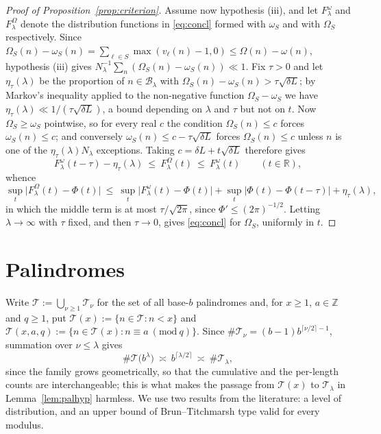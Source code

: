 \documentclass[11pt,a4paper]{article}
\theoremstyle{plain}
\theoremstyle{definition}
\numberwithin{equation}{section}
\begin{document}
\begin{proof}[Proof of Proposition~\ref{prop:criterion}]
Assume now hypothesis (iii), and let $F^{\omega}_\lambda$ and $F^{\Omega}_\lambda$ denote the
distribution functions in \eqref{eq:concl} formed with $\omega_S$ and with $\Omega_S$ respectively.
Since $\Omega_S(n)-\omega_S(n)=\sum_{\ell\in S}\max(v_\ell(n)-1,0)\le\Omega(n)-\omega(n)$, hypothesis
(iii) gives $N_\lambda^{-1}\sum_n(\Omega_S(n)-\omega_S(n))\ll1$. Fix $\tau>0$ and let
$\eta_\tau(\lambda)$ be the proportion of $n\in\mathcal B_\lambda$ with
$\Omega_S(n)-\omega_S(n)>\tau\sqrt{\delta L}$; by Markov's inequality applied to the non-negative
function $\Omega_S-\omega_S$ we have $\eta_\tau(\lambda)\ll1/(\tau\sqrt{\delta L})$, a bound depending
on $\lambda$ and $\tau$ but not on $t$. Now $\Omega_S\ge\omega_S$ pointwise, so for every real $c$ the
condition $\Omega_S(n)\le c$ forces $\omega_S(n)\le c$; and conversely
$\omega_S(n)\le c-\tau\sqrt{\delta L}$ forces $\Omega_S(n)\le c$ unless $n$ is one of the
$\eta_\tau(\lambda)N_\lambda$ exceptions. Taking $c=\delta L+t\sqrt{\delta L}$ therefore gives
\[
F^{\omega}_\lambda(t-\tau)-\eta_\tau(\lambda)\ \le\ F^{\Omega}_\lambda(t)
\ \le\ F^{\omega}_\lambda(t)\qquad(t\in\mathbb R),
\]
whence
\[
\sup_t\bigl|F^{\Omega}_\lambda(t)-\Phi(t)\bigr|\ \le\ \sup_t\bigl|F^{\omega}_\lambda(t)-\Phi(t)\bigr|
+\sup_t\bigl|\Phi(t)-\Phi(t-\tau)\bigr|+\eta_\tau(\lambda),
\]
in which the middle term is at most $\tau/\sqrt{2\pi}$, since $\Phi'\le(2\pi)^{-1/2}$. Letting
$\lambda\to\infty$ with $\tau$ fixed, and then $\tau\to0$, gives \eqref{eq:concl} for $\Omega_S$,
uniformly in $t$.
\end{proof}

\section{Palindromes}\label{sec:pal}

Write $\mathcal T:=\bigcup_{\nu\ge1}\mathcal T_\nu$ for the set of all base-$b$ palindromes and, for
$x\ge1$, $a\in\mathbb Z$ and $q\ge1$, put $\mathcal T(x):=\{n\in\mathcal T:n<x\}$ and
$\mathcal T(x,a,q):=\{n\in\mathcal T(x):n\equiv a\ (\mathrm{mod}\ q)\}$. Since
$\#\mathcal T_\nu=(b-1)b^{\lceil\nu/2\rceil-1}$, summation over $\nu\le\lambda$ gives
\begin{equation}\label{eq:Tsize}
\#\mathcal T\bigl(b^{\lambda}\bigr)\ \asymp\ b^{\lceil\lambda/2\rceil}\ \asymp\ \#\mathcal T_\lambda ,
\end{equation}
since the family grows geometrically, so that the cumulative and the per-length counts are
interchangeable; this is what makes the passage from $\mathcal T(x)$ to $\mathcal T_\lambda$ in
Lemma~\ref{lem:palhyp} harmless. We use two results from the literature: a level of distribution, and
an upper bound of Brun--Titchmarsh type valid for every modulus.
\end{document}
